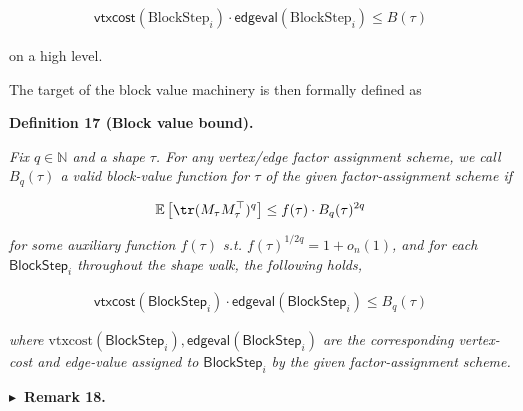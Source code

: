 \documentclass[10pt,a4paper]{article}
\begin{document}
\[\begin{gathered}
\mathsf{vtxcost}(\text{BlockStep}_{i})\cdot\mathsf{edgeval}(\text{BlockStep}_{i})\leq B(\tau)
\end{gathered}\]


on a high level.\par




The target of the block value machinery is then formally defined as\par





\par\medskip\noindent\textbf{
\textbf{Definition 17}\textbf{ }(Block value bound)\textbf{.}
}\par



\emph{Fix $q\in\mathbb{N}$ and a shape $\tau$. For any vertex/edge factor assignment scheme, we call $B_{q}(\tau)$ a valid block-value function for $\tau$ of the given factor-assignment scheme if}\par


\[\begin{gathered}
\mathbb{E}\left[\tr(M_{\tau}M_{\tau}^{\top})^{q}\right]\leq f(\tau)\cdot B_{q}(\tau)^{2q}
\end{gathered}\]


\emph{for some auxiliary function $f(\tau)$ s.t. $f(\tau)^{1/2q}=1+o_{n}(1)$,
and for each $\mathsf{BlockStep}_{i}$ throughout the shape walk, the following holds,}\par


\[\begin{gathered}
\mathsf{vtxcost}(\mathsf{BlockStep}_{i})\cdot\mathsf{edgeval}(\mathsf{BlockStep}_{i})\leq B_{q}(\tau)
\end{gathered}\]


\emph{where $\text{vtxcost}(\mathsf{BlockStep}_{i}),\mathsf{edgeval}(\mathsf{BlockStep}_{i})$ are the corresponding vertex-cost and edge-value assigned to $\mathsf{BlockStep}_{i}$ by the given factor-assignment scheme.}\par







\par\medskip\noindent\textbf{
$\blacktriangleright$ Remark 18.
}\par
\end{document}
